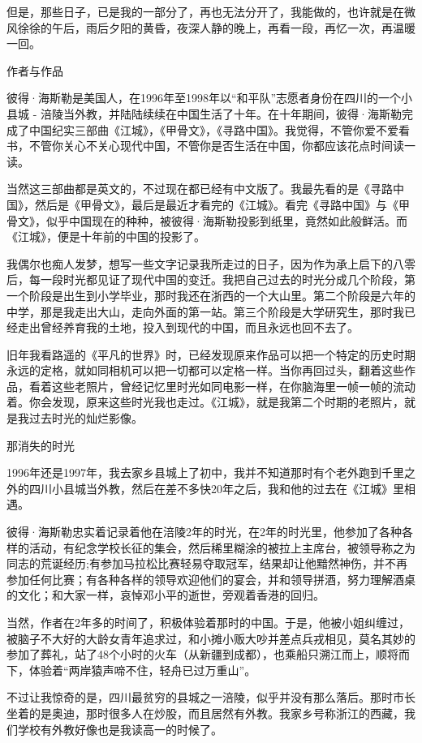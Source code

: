 但是，那些日子，已是我的一部分了，再也无法分开了，我能做的，也许就是在微风徐徐的午后，雨后夕阳的黄昏，夜深人静的晚上，再看一段，再忆一次，再温暖一回。

作者与作品

彼得·海斯勒是美国人，在1996年至1998年以“和平队”志愿者身份在四川的一个小县城 - 涪陵当外教，并陆陆续续在中国生活了十年。在十年期间，彼得·海斯勒完成了中国纪实三部曲《江城》，《甲骨文》，《寻路中国》。我觉得，不管你爱不爱看书，不管你关心不关心现代中国，不管你是否生活在中国，你都应该花点时间读一读。

当然这三部曲都是英文的，不过现在都已经有中文版了。我最先看的是《寻路中国》，然后是《甲骨文》，最后是最近才看完的《江城》。看完《寻路中国》与《甲骨文》，似乎中国现在的种种，被彼得·海斯勒投影到纸里，竟然如此般鲜活。而《江城》，便是十年前的中国的投影了。

我偶尔也痴人发梦，想写一些文字记录我所走过的日子，因为作为承上启下的八零后，每一段时光都见证了现代中国的变迁。我把自己过去的时光分成几个阶段，第一个阶段是出生到小学毕业，那时我还在浙西的一个大山里。第二个阶段是六年的中学，那是我走出大山，走向外面的第一站。第三个阶段是大学研究生，那时我已经走出曾经养育我的土地，投入到现代的中国，而且永远也回不去了。

旧年我看路遥的《平凡的世界》时，已经发现原来作品可以把一个特定的历史时期永远的定格，就如同相机可以把一切都可以定格一样。当你再回过头，翻着这些作品，看着这些老照片，曾经记忆里时光如同电影一样，在你脑海里一帧一帧的流动着。你会发现，原来这些时光我也走过。《江城》，就是我第二个时期的老照片，就是我过去时光的灿烂影像。

那消失的时光

1996年还是1997年，我去家乡县城上了初中，我并不知道那时有个老外跑到千里之外的四川小县城当外教，然后在差不多快20年之后，我和他的过去在《江城》里相遇。

彼得·海斯勒忠实着记录着他在涪陵2年的时光，在2年的时光里，他参加了各种各样的活动，有纪念学校长征的集会，然后稀里糊涂的被拉上主席台，被领导称之为同志的荒诞经历;有参加马拉松比赛轻易夺取冠军，结果却让他黯然神伤，并不再参加任何比赛；有各种各样的领导欢迎他们的宴会，并和领导拼酒，努力理解酒桌的文化；和大家一样，哀悼邓小平的逝世，旁观着香港的回归。

当然，作者在2年多的时间了，积极体验着那时的中国。于是，他被小姐纠缠过，被脑子不大好的大龄女青年追求过，和小摊小贩大吵并差点兵戎相见，莫名其妙的参加了葬礼，站了48个小时的火车（从新疆到成都），也乘船只溯江而上，顺将而下，体验着“两岸猿声啼不住，轻舟已过万重山”。

不过让我惊奇的是，四川最贫穷的县城之一涪陵，似乎并没有那么落后。那时市长坐着的是奥迪，那时很多人在炒股，而且居然有外教。我家乡号称浙江的西藏，我们学校有外教好像也是我读高一的时候了。

